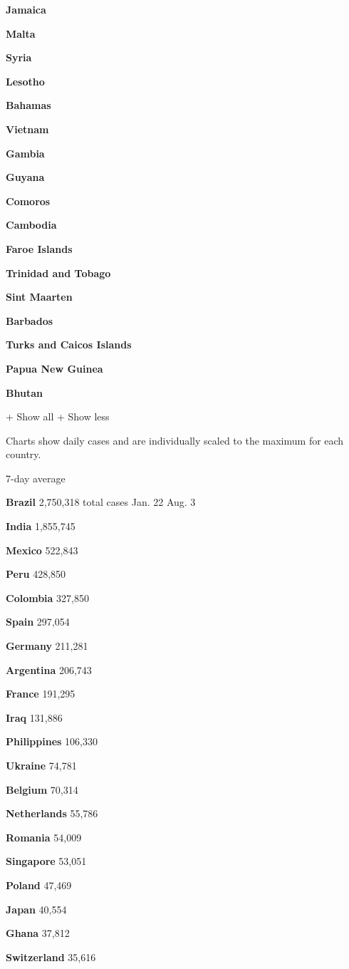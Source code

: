 \textbf{Jamaica}

\textbf{Malta}

\textbf{Syria}

\textbf{Lesotho}

\textbf{Bahamas}

\textbf{Vietnam}

\textbf{Gambia}

\textbf{Guyana}

\textbf{Comoros}

\textbf{Cambodia}

\textbf{Faroe Islands}

\textbf{Trinidad and Tobago}

\textbf{Sint Maarten}

\textbf{Barbados}

\textbf{Turks and Caicos Islands}

\textbf{Papua New Guinea}

\textbf{Bhutan}

+ Show all + Show less

Charts show daily cases and are individually scaled to the maximum for
each country.

7-day average

\textbf{Brazil} 2,750,318 total cases Jan. 22 Aug. 3

\textbf{India} 1,855,745

\textbf{Mexico} 522,843

\textbf{Peru} 428,850

\textbf{Colombia} 327,850

\textbf{Spain} 297,054

\textbf{Germany} 211,281

\textbf{Argentina} 206,743

\textbf{France} 191,295

\textbf{Iraq} 131,886

\textbf{Philippines} 106,330

\textbf{Ukraine} 74,781

\textbf{Belgium} 70,314

\textbf{Netherlands} 55,786

\textbf{Romania} 54,009

\textbf{Singapore} 53,051

\textbf{Poland} 47,469

\textbf{Japan} 40,554

\textbf{Ghana} 37,812

\textbf{Switzerland} 35,616

